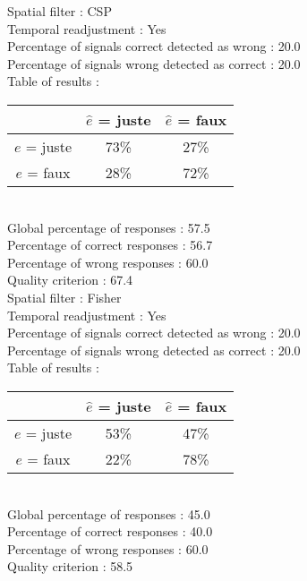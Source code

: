 Spatial filter : CSP \\
Temporal readjustment : Yes \\
Percentage of signals correct detected as wrong :   20.0 \\
Percentage of signals wrong detected as correct :   20.0 \\
Table of results : \\
\begin{tabular}{|c|c|c|}
\hline				& $\hat{e}$ = juste & $\hat{e}$ = faux \\
\hline  $e$ = juste	&     73\%			&     27\%		\\
\hline  $e$ = faux	&     28\%			&     72\%		\\
\hline
\end{tabular}\\
Global percentage of responses :   57.5 \\
Percentage of correct responses :   56.7 \\
Percentage of wrong responses :   60.0 \\
Quality criterion :   67.4 \\

Spatial filter : Fisher \\
Temporal readjustment : Yes \\
Percentage of signals correct detected as wrong :   20.0 \\
Percentage of signals wrong detected as correct :   20.0 \\
Table of results : \\
\begin{tabular}{|c|c|c|}
\hline				& $\hat{e}$ = juste & $\hat{e}$ = faux \\
\hline  $e$ = juste	&     53\%			&     47\%		\\
\hline  $e$ = faux	&     22\%			&     78\%		\\
\hline
\end{tabular}\\
Global percentage of responses :   45.0 \\
Percentage of correct responses :   40.0 \\
Percentage of wrong responses :   60.0 \\
Quality criterion :   58.5 \\

\newpage
